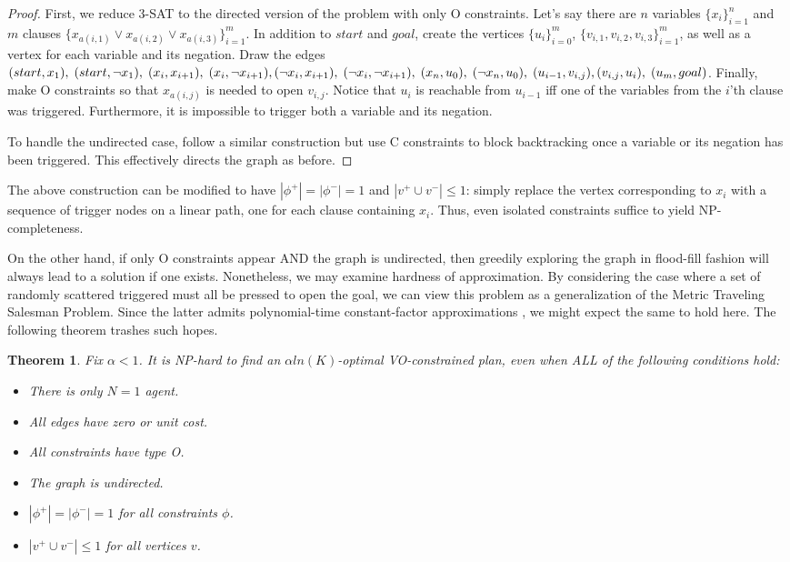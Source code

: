 \documentclass[letterpaper]{article}
\newtheorem{thm}{Theorem}
\begin{document}
\begin{proof}
First, we reduce 3-SAT to the directed version of the problem with only O constraints. Let's say there are $n$ variables $\{x_i\}_{i=1}^n$ and $m$ clauses $\{x_{a(i,1)} \vee x_{a(i,2)} \vee x_{a(i,3)} \}_{i=1}^m$. In addition to $start$ and $goal$, create the vertices $\{u_i\}_{i=0}^m$, $\{v_{i,1},v_{i,2},v_{i,3}\}_{i=1}^m$, as well as a vertex for each variable and its negation. Draw the edges
$(start,x_1),\;(start,\neg x_1),\;(x_i,x_{i+1}),\;(x_i,\neg x_{i+1}),\;
\\(\neg x_i,x_{i+1}),\;(\neg x_i,\neg x_{i+1}),\;(x_n,u_0),\;(\neg x_n,u_0),\;(u_{i-1},v_{i,j}),\;
\\(v_{i,j},u_i),\;(u_m,goal)$.
Finally, make O constraints so that $x_{a(i,j)}$ is needed to open $v_{i,j}$. Notice that $u_i$ is reachable from $u_{i-1}$ iff one of the variables from the $i$'th clause was triggered. Furthermore, it is impossible to trigger both a variable and its negation.

To handle the undirected case, follow a similar construction but use C constraints to block backtracking once a variable or its negation has been triggered. This effectively directs the graph as before.
\end{proof}

The above construction can be modified to have $|\phi^+| = |\phi^-| = 1$ and $|v^+ \cup v^-| \le 1$: simply replace the vertex corresponding to $x_i$ with a sequence of trigger nodes on a linear path, one for each clause containing $x_i$. Thus, even isolated constraints suffice to yield NP-completeness.

On the other hand, if only O constraints appear AND the graph is undirected, then greedily exploring the graph in flood-fill fashion will always lead to a solution if one exists. Nonetheless, we may examine hardness of approximation. By considering the case where a set of randomly scattered triggered must all be pressed to open the goal, we can view this problem as a generalization of the Metric Traveling Salesman Problem. Since the latter admits polynomial-time constant-factor approximations \cite{christofides1976worst}, we might expect the same to hold here. The following theorem trashes such hopes.

\begin{thm}
Fix $\alpha < 1$. It is NP-hard to find an $\alpha ln(K)$-optimal VO-constrained plan, even when ALL of the following conditions hold:
\begin{itemize}
\item There is only $N=1$ agent.
\item All edges have zero or unit cost.
\item All constraints have type O.
\item The graph is undirected.
\item $|\phi^+| = |\phi^-| = 1$ for all constraints $\phi$.
\item $|v^+ \cup v^-| \le 1$ for all vertices $v$.
\end{itemize}
\end{thm}
\end{document}

